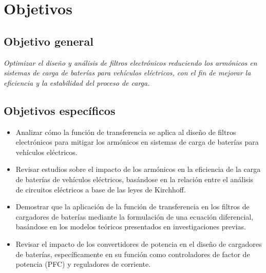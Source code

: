 \section{Objetivos}
\label{sec:objetivos}

\subsection*{Objetivo general}
\textit{Optimizar el dise\~no y an\'alisis de filtros electr\'onicos reduciendo los arm\'onicos en sistemas de carga de bater\'ias para veh\'iculos el\'ectricos, con el fin de mejorar la eficiencia y la estabilidad del proceso de carga.}

\subsection*{Objetivos espec\'ificos}
\begin{itemize}
  \item Analizar c\'omo la funci\'on de transferencia se aplica al dise\~no de filtros electr\'onicos para mitigar los arm\'onicos en sistemas de carga de bater\'ias para veh\'iculos el\'ectricos.
  \item Revisar estudios sobre el impacto de los arm\'onicos en la eficiencia de la carga de bater\'ias de veh\'iculos el\'ectricos, bas\'andose en la relaci\'on entre el an\'alisis de circuitos el\'ectricos a base de las leyes de Kirchhoff.
  \item Demostrar que la aplicaci\'on de la funci\'on de transferencia en los filtros de cargadores de bater\'ias mediante la formulaci\'on de una ecuaci\'on diferencial, bas\'andose en los modelos te\'oricos presentados en investigaciones previas.
  \item Revisar el impacto de los convertidores de potencia en el dise\~no de cargadores de bater\'ias, espec\'ificamente en su funci\'on como controladores de factor de potencia (PFC) y reguladores de corriente.
\end{itemize}
